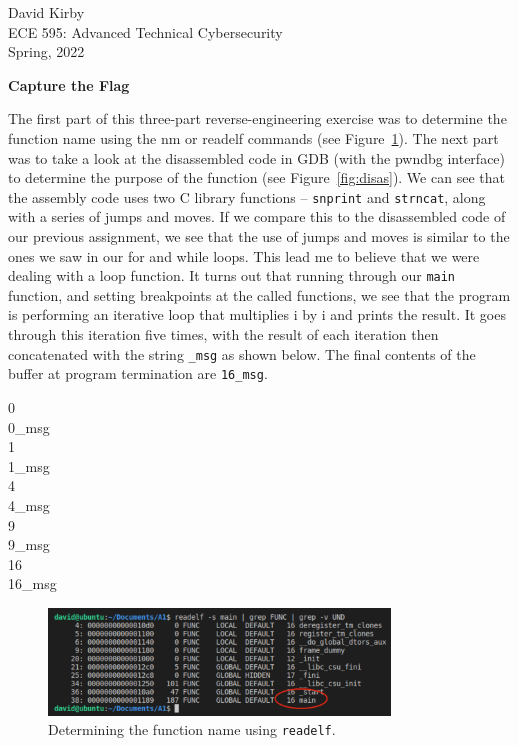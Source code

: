 \documentclass[12pt]{article}
\begin{document}
\setmainfont{SF Pro Text}
\setsansfont{SF Pro Text}
\setmonofont{SF Mono}
\renewcommand{\familydefault}{\sfdefault}

\hypersetup{
    linkcolor=CrispBlue,
    urlcolor=CrispBlue,
    breaklinks=true
}

\noindent David Kirby\\
ECE 595: Advanced Technical Cybersecurity\\
Spring, 2022
\begin{center}
    \large\bfseries Capture the Flag
\end{center}

The first part of this three-part reverse-engineering exercise was to determine the function name using the nm or readelf commands (see Figure~\ref{fig:readelf}). The next part was to take a look at the disassembled code in GDB (with the pwndbg interface) to determine the purpose of the function (see Figure~\ref{fig:disas}). We can see that the assembly code uses two C library functions -- \texttt{snprint} and \texttt{strncat}, along with a series of jumps and moves. If we compare this to the disassembled code of our previous assignment, we see that the use of jumps and moves is similar to the ones we saw in our for and while loops. This lead me to believe that we were dealing with a loop function. It turns out that running through our \texttt{main} function, and setting breakpoints at the called functions, we see that the program is performing an iterative loop that multiplies i by i and prints the result. It goes through this iteration five times, with the result of each iteration then concatenated with the string \texttt{\_msg} as shown below. The final contents of the buffer at program termination are \texttt{16\_msg}.

\begin{tcolorbox}[colback=CrispBlue!5!white,colframe=CrispBlue!75!black,title=Output of five iterations of the function.]
0\\
0\_msg\\
1\\
1\_msg\\
4\\
4\_msg\\
9\\
9\_msg\\
16\\
16\_msg
\end{tcolorbox}

\begin{figure}[!ht]
    \centering
    \includegraphics[width=0.81\textwidth]{figure05.png}
    \caption{Determining the function name using \texttt{readelf}.}
    \label{fig:readelf}
\end{figure}
\end{document}
